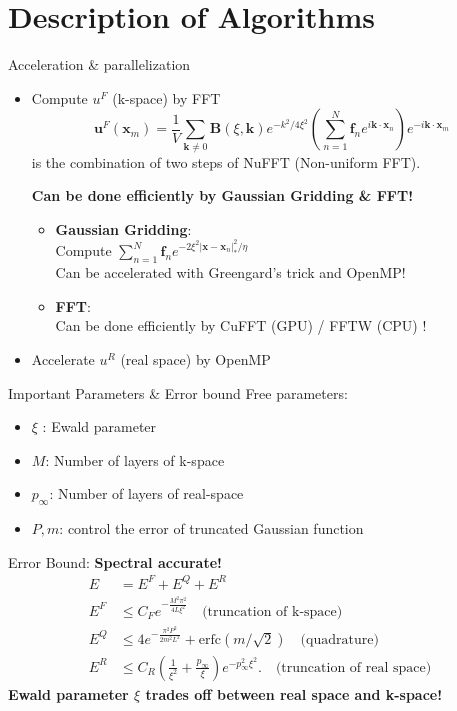\documentclass{beamer}
\begin{document}
\section{Description of Algorithms}

\begin{frame}{Acceleration \& parallelization}
\begin{itemize}
	\item Compute $u^F$ (k-space) by FFT \\
	\begin{equation}
	\mathbf{u}^F (\mathbf{x}_m) = \frac{1}{V} \sum_{\mathbf{k} \neq 0} \mathbf{B}(\xi, \mathbf{k}) e^{-k^2/4\xi^2} \left(\sum_{n=1}^{N} \mathbf{f}_n e ^{i \mathbf{k} \cdot \mathbf{x}_n} \right)e ^{-i \mathbf{k} \cdot \mathbf{x}_m}
	\end{equation}
	is the combination of two steps of NuFFT (Non-uniform FFT).
	
	\textbf{Can be done efficiently by Gaussian Gridding \& FFT!}
	\begin{itemize}
		\item \textbf{Gaussian Gridding}: \\
		Compute $ \sum_{n=1}^N \mathbf{f}_n e^{-2 \xi^2 |\mathbf{x} - \mathbf{x}_n|_{\ast}^2 / \eta}$ \\
		Can be accelerated with Greengard's trick \cite{Greengard2004} and  OpenMP!
		\item \textbf{FFT}: \\
		Can be done efficiently by CuFFT (GPU) / FFTW (CPU) !
	\end{itemize}

	\item Accelerate $u^R$ (real space) by OpenMP 
\end{itemize}

\end{frame}

\begin{frame}{Important Parameters \& Error bound}
Free parameters:
\begin{itemize}
	\item $\xi$ : Ewald parameter
	\item $M$: Number of layers of k-space
	\item $p_{\infty}$: Number of layers of real-space
	\item $P, m$: control the error of truncated Gaussian function
\end{itemize}
Error Bound: \textbf{Spectral accurate!}
\begin{align}
E & = E^F + E^Q + E^R \\
E^F & \le C_F e^{-\frac{M^2 \pi^2}{4 L \xi^2}} \quad  \text{(truncation of k-space)}\\
E^Q & \le  4 e^{- \frac{\pi^2 P^2}{2 m^2 L^2}} + \text{erfc} (m / \sqrt{2}) \quad  \text{(quadrature)}\\
E^R & \le C_R (\frac{1}{\xi^2} + \frac{p_{\infty}}{\xi}) e^{-p_{\infty}^2 \xi^2}. \quad \text{(truncation of real space)}
\end{align}
\textbf{Ewald parameter $\xi$ trades off between real space and k-space!}
\end{frame}
\end{document}
